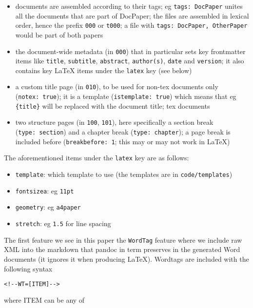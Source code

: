 \documentclass[11pt]{article}
\def\tightlist{}
\begin{document}
\begin{itemize}
\item
  documents are assembled according to their tags; eg
  \texttt{tags:\ DocPaper} unites all the documents that are part of
  DocPaper; the files are assembled in lexical order, hence the prefix
  \texttt{000} or \texttt{t000}; a file with
  \texttt{tags:\ DocPaper,\ OtherPaper} would be part of both papers
\item
  the document-wide metadata (in \texttt{000}) that in particular sets
  key frontmatter items like \texttt{title}, \texttt{subtitle},
  \texttt{abstract}, \texttt{author(s)}, \texttt{date} and
  \texttt{version}; it also contains key LaTeX items under the
  \texttt{latex} key (see below)
\item
  a custom title page (in \texttt{010}), to be used for non-tex
  documents only (\texttt{notex:\ true}); it is a template
  (\texttt{istemplate:\ true}) which means that eg \texttt{\{title\}}
  will be replaced with the document title; tex documents
\item
  two structure pages (in \texttt{100}, \texttt{101}), here specifically
  a section break (\texttt{type:\ section}) and a chapter break
  (\texttt{type:\ chapter}); a page break is included before
  (\texttt{breakbefore:\ 1}; this may or may not work in LaTeX)
\end{itemize}

The aforementioned items under the \texttt{latex} key are as follows:

\begin{itemize}
\tightlist
\item
  \texttt{template}: which template to use (the templates are in
  \texttt{code/templates})
\item
  \texttt{fontsizea}: eg \texttt{11pt}
\item
  \texttt{geometry}: eg \texttt{a4paper}
\item
  \texttt{stretch}: eg \texttt{1.5} for line spacing
\end{itemize}

The first feature we see in this paper the \texttt{WordTag} feature
where we include raw XML into the markdown that pandoc in term preserves
in the generated Word documents (it ignores it when producing LaTeX).
Wordtags are included with the following syntax

\begin{verbatim}
<!--WT=[ITEM]-->
\end{verbatim}

where ITEM can be any of
\end{document}

